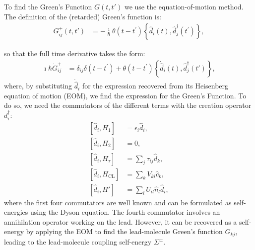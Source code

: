 \documentclass{article}
\begin{document}
\begin{multicols}{2}
        To find the Green's Function $G(t,t')$ we use the equation-of-motion method. The definition of the (retarded) Green's function is:
       \begin{align*}
        G_{ij}^+(t,t') &= - \frac{\imath}{\hbar} \theta(t-t^\prime) \left\{ \hat{d}_i(t), \hat{d}_j^\dagger(t^\prime) \right\},
        \end{align*} 
        
        so that the full time derivative takes the form:
        \begin{align}
        \imath\hbar \dot{G}_{ij}^+ &= \delta_{ij} \delta(t - t^\prime) + \theta(t-t^\prime) \left\{ \dot{\hat{d}}_i (t), \hat{d}_j^\dagger (t')\right\},
        \label{eq:eomgf} 
        \end{align} where, by substituting $\dot{\hat{d}}_i$ for the expression recovered from its Heisenberg equation of motion (EOM), we find the expression for the Green's Function. To do so, we need the commutators of the different terms with the creation operator $d^\dagger_i$:
        \begin{align*}
            \left[ \hat{d}_i, H_1 \right] &= \epsilon_i \hat{d}_i, \\
            \left[ \hat{d}_i, H_2 \right] &= 0, \\
            \left[ \hat{d}_i, H_\tau \right] &= \sum_j \tau_{ij} \hat{d}_k, \\
            \left[ \hat{d}_i, H_\text{CL} \right] &= \sum_k V_{ki} \hat{c}_k,\\
            \left[ \hat{d}_i, H' \right] &= \sum_l U_{il} \hat{n}_l \hat{d}_i,
        \end{align*}
        where the first four commutators are well known and can be formulated as self-energies using the Dyson equation. The fourth commutator involves an annihilation operator working on the lead. However, it can be recovered as a self-energy by applying the EOM to find the lead-molecule Green's function $G_{kj}$, leading to the lead-molecule coupling self-energy $\Sigma^\pm$.        
        

\end{multicols}
\end{document}
